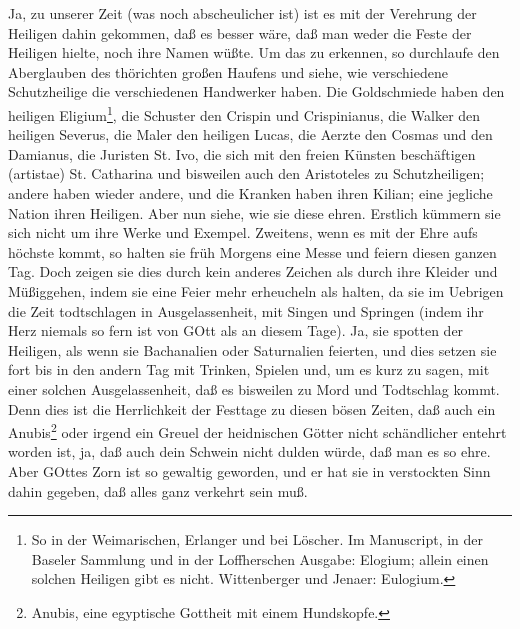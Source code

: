 Ja, zu unserer Zeit (was noch abscheulicher ist) ist es mit der Verehrung der Heiligen dahin gekommen, daß es besser wäre, daß man weder die Feste der Heiligen hielte, noch ihre Namen wüßte. Um das zu erkennen, so durchlaufe den Aberglauben des thörichten großen Haufens und siehe, wie verschiedene Schutzheilige die verschiedenen Handwerker haben. Die Goldschmiede haben den heiligen Eligium\footnote{So in der Weimarischen, Erlanger und bei Löscher. Im Manuscript, in der Baseler Sammlung und in der Loffherschen Ausgabe: Elogium; allein einen solchen Heiligen gibt es nicht. Wittenberger und Jenaer: Eulogium.}, die Schuster den Crispin und Crispinianus, die Walker den heiligen Severus, die Maler den heiligen Lucas, die Aerzte den Cosmas und den Damianus, die Juristen St. Ivo, die sich mit den freien Künsten beschäftigen (artistae) St. Catharina und bisweilen auch den Aristoteles zu Schutzheiligen; andere haben wieder andere, und die Kranken haben ihren Kilian; eine jegliche Nation ihren Heiligen. Aber nun siehe, wie sie diese ehren. Erstlich kümmern sie sich nicht um ihre Werke und Exempel. Zweitens, wenn es mit der Ehre aufs höchste kommt, so halten sie früh Morgens eine Messe und feiern diesen ganzen Tag. Doch zeigen sie dies durch kein anderes Zeichen als durch ihre Kleider und Müßiggehen, indem sie eine Feier mehr erheucheln als halten, da sie im Uebrigen die Zeit todtschlagen in Ausgelassenheit, mit Singen und Springen (indem ihr Herz niemals so fern ist von GOtt als an diesem Tage). Ja, sie spotten der Heiligen, als wenn sie Bachanalien oder Saturnalien feierten, und dies setzen sie fort bis in den andern Tag mit Trinken, Spielen und, um es kurz zu sagen, mit einer solchen Ausgelassenheit, daß es bisweilen zu Mord und Todtschlag kommt. Denn dies ist die Herrlichkeit der Festtage zu diesen bösen Zeiten, daß auch ein Anubis\footnote{Anubis, eine egyptische Gottheit mit einem Hundskopfe.} oder irgend ein Greuel der heidnischen Götter nicht schändlicher entehrt worden ist, ja, daß auch dein Schwein nicht dulden würde, daß man es so ehre. Aber GOttes Zorn ist so gewaltig geworden, und er hat sie in verstockten Sinn dahin gegeben, daß alles ganz verkehrt sein muß.


